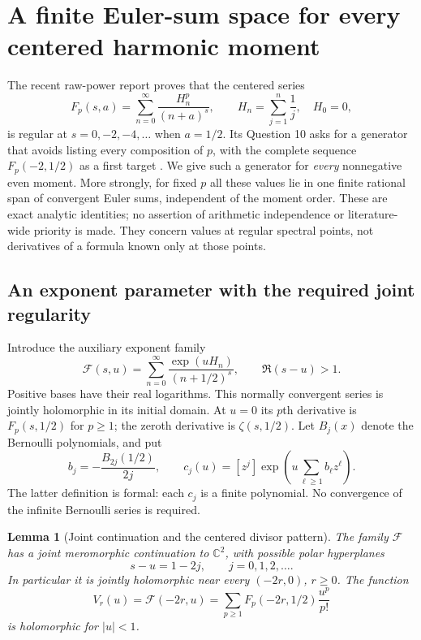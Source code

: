 \documentclass[11pt,a4paper]{article}
\numberwithin{equation}{section}
\newtheorem{lemma}[theorem]{Lemma}
\theoremstyle{definition}
\theoremstyle{remark}
\begin{document}

\section{A finite Euler-sum space for every centered harmonic moment}
\label{hpnew:section}

The recent raw-power report proves that the centered series
\[
 F_p(s,a)=\sum_{n=0}^{\infty}\frac{H_n^p}{(n+a)^s},\qquad
 H_n=\sum_{j=1}^n\frac1j,\quad H_0=0,
\]
is regular at $s=0,-2,-4,\ldots$ when $a=1/2$.
Its Question 10 asks for a generator that avoids listing every
composition of $p$, with the complete sequence $F_p(-2,1/2)$ as a
first target \cite{RepoExactResonant}. We give such a generator for
\emph{every} nonnegative even moment. More strongly, for fixed $p$ all
these values lie in one finite rational span of convergent Euler sums,
independent of the moment order. These are exact analytic identities;
no assertion of arithmetic independence or literature-wide priority is
made. They concern values at regular spectral points, not derivatives
of a formula known only at those points.

\subsection{An exponent parameter with the required joint regularity}

Introduce the auxiliary exponent family
\begin{equation}\label{hpnew:exponent}
 \mathscr F(s,u)=\sum_{n=0}^{\infty}
       \frac{\exp(uH_n)}{(n+1/2)^s},\qquad
                    \Re(s-u)>1.
\end{equation}
Positive bases have their real logarithms. This normally convergent
series is jointly holomorphic in its initial domain. At $u=0$ its
$p$th derivative is $F_p(s,1/2)$ for $p\ge1$; the zeroth derivative is
$\zeta(s,1/2)$. Let $B_j(x)$ denote the Bernoulli polynomials, and put
\begin{equation}\label{hpnew:coefficients}
 b_j=-\frac{B_{2j}(1/2)}{2j},\qquad
 c_j(u)=[z^j]\exp\left(u\sum_{\ell\ge1}b_\ell z^\ell\right).
\end{equation}
The latter definition is formal: each $c_j$ is a finite polynomial.
No convergence of the infinite Bernoulli series is required.

\begin{lemma}[Joint continuation and the centered divisor pattern]
\label{hpnew:joint}
The family $\mathscr F$ has a joint meromorphic continuation to
$\mathbb C^2$, with possible polar hyperplanes
\begin{equation}\label{hpnew:divisors}
                         s-u=1-2j,\qquad j=0,1,2,\ldots.
\end{equation}
In particular it is jointly holomorphic near every $(-2r,0)$,
$r\ge0$. The function
\begin{equation}\label{hpnew:V}
 V_r(u)=\mathscr F(-2r,u)
       =\sum_{p\ge1}F_p(-2r,1/2)\frac{u^p}{p!}
\end{equation}
is holomorphic for $|u|<1$.
\end{lemma}
\end{document}
